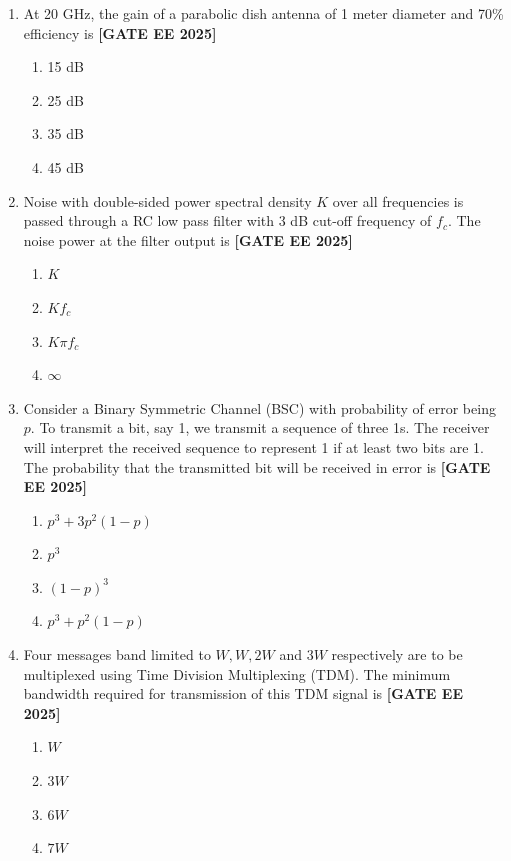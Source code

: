 \documentclass[12pt,a4paper]{article}
\begin{document}
\begin{enumerate}[leftmargin=*, label=\textbf{Q.\arabic*:}]
\item At 20 GHz, the gain of a parabolic dish antenna of 1 meter diameter and 70\% efficiency is
\newline
\noindent \textbf{[GATE EE 2025]}
\begin{enumerate}[label=(\Alph*)]
  \item 15 dB
  \item 25 dB
  \item 35 dB
  \item 45 dB
\end{enumerate}

\item Noise with double-sided power spectral density $K$ over all frequencies is passed through a RC low pass filter with 3 dB cut-off frequency of $f_c$. The noise power at the filter output is
\newline
\noindent \textbf{[GATE EE 2025]}
\begin{enumerate}[label=(\Alph*)]
  \item $K$
  \item $K f_c$
  \item $K \pi f_c$
  \item $\infty$
\end{enumerate}

\item Consider a Binary Symmetric Channel (BSC) with probability of error being $p$. To transmit a bit, say 1, we transmit a sequence of three 1s. The receiver will interpret the received sequence to represent 1 if at least two bits are 1. The probability that the transmitted bit will be received in error is
\newline
\noindent \textbf{[GATE EE 2025]}
\begin{enumerate}[label=(\Alph*)]
  \item $p^3 + 3p^2(1-p)$
  \item $p^3$
  \item $(1-p)^3$
  \item $p^3 + p^2(1-p)$
\end{enumerate}

\item Four messages band limited to $W, W, 2W$ and $3W$ respectively are to be multiplexed using Time Division Multiplexing (TDM). The minimum bandwidth required for transmission of this TDM signal is
\newline
\noindent \textbf{[GATE EE 2025]}
\begin{enumerate}[label=(\Alph*)]
  \item $W$
  \item $3W$
  \item $6W$
  \item $7W$
\end{enumerate}


\end{enumerate}
\end{document}
